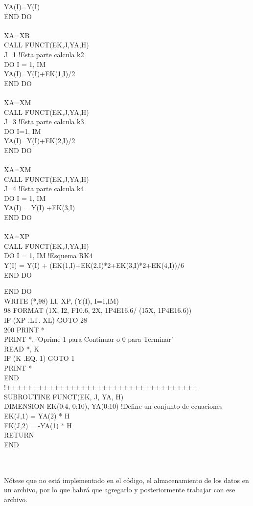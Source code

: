 \documentclass[12pt]{article}
\begin{document}
{\begin{tabbing}
\> \> YA(I)=Y(I) \\
\> END DO \\
\> \\
\> XA=XB \\
\> CALL FUNCT(EK,J,YA,H) \\
\> J=1 \> \> !Esta parte calcula k2 \\
\> DO I = 1, IM \\
\> \> YA(I)=Y(I)+EK(1,I)/2 \\
\> END DO \\
\> \\
\> XA=XM \\
\> CALL FUNCT(EK,J,YA,H) \\
\> J=3 \> \> !Esta parte calcula k3 \\
\> DO I=1, IM \\
\> \> YA(I)=Y(I)+EK(2,I)/2 \\
\> END DO \\
\> \\
\> XA=XM \\
\> CALL FUNCT(EK,J,YA,H) \\
\> J=4 \> \> !Esta parte calcula k4 \\
\> DO I = 1, IM \\
\> \> YA(I) = Y(I) +EK(3,I) \\
\> END DO \\
\> \\
\> XA=XP \\
\> CALL FUNCT(EK,J,YA,H) \\
\> DO I = 1, IM \> \> !Esquema RK4 \\
\> \> Y(I) = Y(I) + (EK(1,I)+EK(2,I)*2+EK(3,I)*2+EK(4,I))/6 \\
\> END DO
\end{tabbing}
END DO\\
WRITE (*,98) LI, XP, (Y(I), I=1,IM) \\
98 FORMAT (1X, I2, F10.6, 2X, 1P4E16.6/ (15X, 1P4E16.6)) \\
IF (XP .LT. XL) GOTO 28 \\
200 PRINT * \\
PRINT *, 'Oprime 1 para Continuar o 0 para Terminar' \\
READ *, K \\
IF (K .EQ. 1) GOTO 1 \\
PRINT * \\
END \\
!++++++++++++++++++++++++++++++++++++ \\
SUBROUTINE FUNCT(EK, J, YA, H) \\
DIMENSION EK(0:4, 0:10), YA(0:10) \hspace{2cm} !Define un conjunto de ecuaciones \\
EK(J,1) = YA(2) * H \\
EK(J,2) = -YA(1) * H \\
RETURN \\
END}
\\
\\
Nótese que no está implementado en el código, el almacenamiento de los datos en un archivo, por lo que habrá que agregarlo y posteriormente trabajar con ese archivo.
\end{document}
